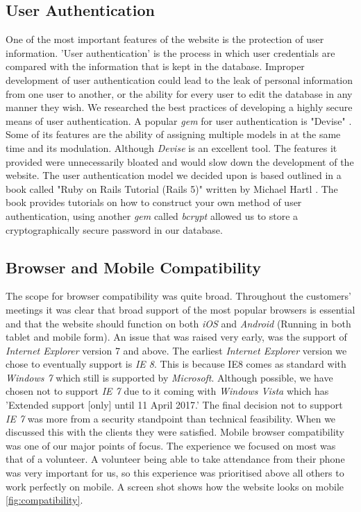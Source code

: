 \documentclass{l3proj}
\begin{document}
\subsection{User Authentication}
\label{sec:authentication}

One of the most important features of the website is the protection of user information. 'User authentication' \cite{authentication} is the process in which user credentials are compared with the information that is kept in the database. Improper development of user authentication could lead to the leak of personal information from one user to another, or the ability for every user to edit the database in any manner they wish. We researched the best practices of developing a highly secure means of user authentication. A popular \textit{gem} for user authentication is "Devise" \cite{devise}. Some of its features are the ability of assigning multiple models in at the same time and its modulation. Although \textit{Devise} is an excellent tool. The features it provided were unnecessarily bloated and would slow down the development of the website. The user authentication model we decided upon is based outlined in a book called "Ruby on Rails Tutorial (Rails 5)" written by Michael Hartl \cite{rails-tutorial}. The book provides tutorials on how to construct your own method of user authentication, using another \textit{gem} called \textit{bcrypt} allowed us to store a cryptographically secure password in our database.

\subsection{Browser and Mobile Compatibility}
\label{sec:compatibility}

The scope for browser compatibility was quite broad. Throughout the customers' meetings it was clear that broad support of the most popular browsers is essential and that the website should function on both \textit{iOS} and \textit{Android} (Running in both tablet and mobile form).
An issue that was raised very early, was the support of \textit{Internet Explorer} version 7 and above. The earliest \textit{Internet Explorer} version we chose to eventually support is \textit{IE 8}. This is because IE8 comes as standard with \textit{Windows 7} which still is supported by \textit{Microsoft}. Although possible, we have chosen not to support \textit{IE 7} due to it coming with \textit{Windows Vista} which has 'Extended support [only] until 11 April 2017.' The final decision not to support \textit{IE 7} was more from a security standpoint than technical feasibility. When we discussed this with the clients they were satisfied. Mobile browser compatibility was one of our major points of focus. The experience we focused on most was that of a volunteer. A volunteer being able to take attendance from their phone was very important for us, so this experience was prioritised above all others to work perfectly on mobile. A screen shot shows how the website looks on mobile \autoref{fig:compatibility}.
\end{document}

